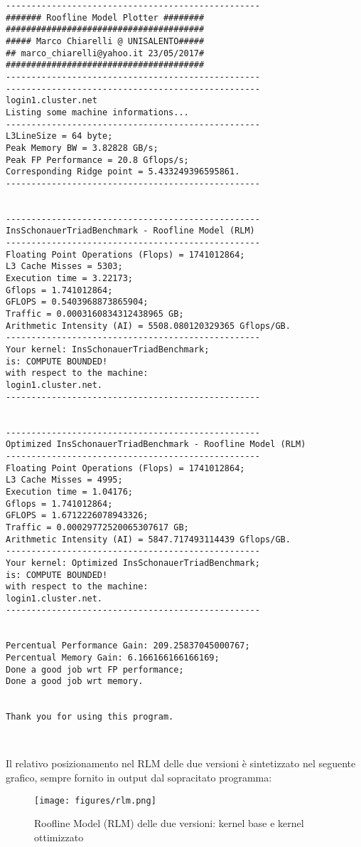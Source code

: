 \begin{lstlisting}[breaklines=true]
--------------------------------------------------
####### Roofline Model Plotter ########
#######################################
##### Marco Chiarelli @ UNISALENTO#####
## marco_chiarelli@yahoo.it 23/05/2017#
#######################################
--------------------------------------------------
--------------------------------------------------
login1.cluster.net
Listing some machine informations...
--------------------------------------------------
L3LineSize = 64 byte;
Peak Memory BW = 3.82828 GB/s;
Peak FP Performance = 20.8 Gflops/s;
Corresponding Ridge point = 5.433249396595861.
--------------------------------------------------
 
 
--------------------------------------------------
InsSchonauerTriadBenchmark - Roofline Model (RLM)
--------------------------------------------------
Floating Point Operations (Flops) = 1741012864;
L3 Cache Misses = 5303;
Execution time = 3.22173;
Gflops = 1.741012864;
GFLOPS = 0.5403968873865904;
Traffic = 0.0003160834312438965 GB;
Arithmetic Intensity (AI) = 5508.080120329365 Gflops/GB.
--------------------------------------------------
Your kernel: InsSchonauerTriadBenchmark;
is: COMPUTE BOUNDED!
with respect to the machine: 
login1.cluster.net.
--------------------------------------------------
 
 
--------------------------------------------------
Optimized InsSchonauerTriadBenchmark - Roofline Model (RLM)
--------------------------------------------------
Floating Point Operations (Flops) = 1741012864;
L3 Cache Misses = 4995;
Execution time = 1.04176;
Gflops = 1.741012864;
GFLOPS = 1.6712226078943326;
Traffic = 0.00029772520065307617 GB;
Arithmetic Intensity (AI) = 5847.717493114439 Gflops/GB.
--------------------------------------------------
Your kernel: Optimized InsSchonauerTriadBenchmark;
is: COMPUTE BOUNDED!
with respect to the machine: 
login1.cluster.net.
--------------------------------------------------
 
 
Percentual Performance Gain: 209.25837045000767;
Percentual Memory Gain: 6.166166166166169;
Done a good job wrt FP performance;
Done a good job wrt memory.
 
 
Thank you for using this program.
 
 

\end{lstlisting}

Il relativo posizionamento nel RLM delle due versioni è sintetizzato nel seguente grafico, sempre fornito in output dal sopracitato programma:

\begin{center}
\begin{figure}[H]
\centering
\texttt{[image: figures/rlm.png]}
\caption{Roofline Model (RLM) delle due versioni: kernel base e kernel ottimizzato}
\end{figure}
\end{center}
